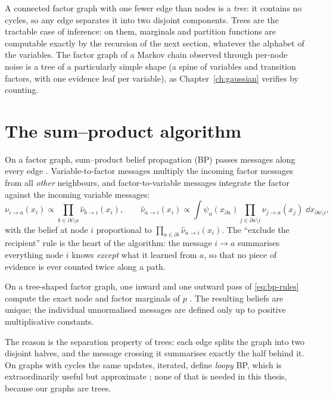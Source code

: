 A connected factor graph with one fewer edge than nodes is a
\emph{tree}: it contains no cycles, so any edge separates it into two
disjoint components. Trees are the tractable case of inference: on
them, marginals and partition functions are computable exactly by the
recursion of the next section, whatever the alphabet of the variables.
The factor graph of a Markov chain observed through per-node noise is a
tree of a particularly simple shape (a spine of variables and transition
factors, with one evidence leaf per variable), as
Chapter~\ref{ch:gaussian} verifies by counting.

\section{The sum--product algorithm}\label{sec:sum-product}

On a factor graph, sum--product belief propagation (BP) passes messages
along every edge \citep{pearl1988probabilistic, kschischang2001factor,
mezard2009information}. Variable-to-factor messages multiply the
incoming factor messages from all \emph{other} neighbours, and
factor-to-variable messages integrate the factor against the incoming
variable messages:
\begin{equation}
  \nu_{i \to a}(x_i) \propto
    \prod_{b \in \partial i \setminus a} \hat\nu_{b \to i}(x_i),
  \qquad
  \hat\nu_{a \to i}(x_i) \propto
    \int \psi_a(x_{\partial a})
    \prod_{j \in \partial a \setminus i} \nu_{j \to a}(x_j)\;
    \dd x_{\partial a \setminus i},
  \label{eq:bp-rules}
\end{equation}
with the belief at node $i$ proportional to
$\prod_{a \in \partial i} \hat\nu_{a \to i}(x_i)$. The ``exclude the
recipient'' rule is the heart of the algorithm: the message $i \to a$
summarises everything node $i$ knows \emph{except} what it learned from
$a$, so that no piece of evidence is ever counted twice along a path.

\begin{theorem}\label{thm:tree-exact}
On a tree-shaped factor graph, one inward and one outward pass of
\eqref{eq:bp-rules} compute the exact node and factor marginals of $p$
\citep[Theorem~14.1]{mezard2009information}. The resulting beliefs are
unique; the individual unnormalised messages are defined only up to positive
multiplicative constants.
\end{theorem}

The reason is the separation property of trees: each edge splits the
graph into two disjoint halves, and the message crossing it summarises
exactly the half behind it. On graphs with cycles the same updates,
iterated, define \emph{loopy} BP, which is extraordinarily useful but
approximate \citep{weiss2001correctness, malioutov2006walk}; none of that
is needed in this thesis, because our graphs are trees.

